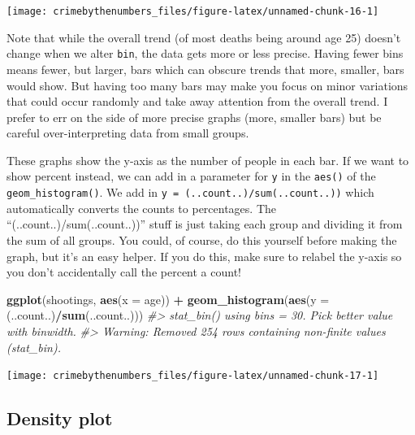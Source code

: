 \documentclass[
  12pt,
]{book}
\newenvironment{Shaded}{\begin{snugshade}}{\end{snugshade}}
\newcommand{\CommentTok}[1]{\textcolor[rgb]{0.37,0.37,0.37}{\textit{#1}}}
\newcommand{\DataTypeTok}[1]{\textcolor[rgb]{0.27,0.27,0.27}{#1}}
\newcommand{\KeywordTok}[1]{\textcolor[rgb]{0.27,0.27,0.27}{\textbf{#1}}}
\newcommand{\NormalTok}[1]{#1}
\newcommand{\OperatorTok}[1]{\textcolor[rgb]{0.43,0.43,0.43}{\textbf{#1}}}
\newcommand{\StringTok}[1]{\textcolor[rgb]{0.5,0.5,0.5}{#1}}
\begin{document}
\begin{center}\texttt{[image: crimebythenumbers\_files/figure-latex/unnamed-chunk-16-1]} \end{center}

Note that while the overall trend (of most deaths being around age 25) doesn't change when we alter \texttt{bin}, the data gets more or less precise. Having fewer bins means fewer, but larger, bars which can obscure trends that more, smaller, bars would show. But having too many bars may make you focus on minor variations that could occur randomly and take away attention from the overall trend. I prefer to err on the side of more precise graphs (more, smaller bars) but be careful over-interpreting data from small groups.

These graphs show the y-axis as the number of people in each bar. If we want to show percent instead, we can add in a parameter for \texttt{y} in the \texttt{aes()} of the \texttt{geom\_histogram()}. We add in \texttt{y\ =\ (..count..)/sum(..count..))} which automatically converts the counts to percentages. The ``(..count..)/sum(..count..))'' stuff is just taking each group and dividing it from the sum of all groups. You could, of course, do this yourself before making the graph, but it's an easy helper. If you do this, make sure to relabel the y-axis so you don't accidentally call the percent a count!

\begin{Shaded}
\begin{Highlighting}[]
\KeywordTok{ggplot}\NormalTok{(shootings, }\KeywordTok{aes}\NormalTok{(}\DataTypeTok{x =}\NormalTok{ age)) }\OperatorTok{+}\StringTok{ }
\StringTok{  }\KeywordTok{geom\_histogram}\NormalTok{(}\KeywordTok{aes}\NormalTok{(}\DataTypeTok{y =}\NormalTok{ (..count..)}\OperatorTok{/}\KeywordTok{sum}\NormalTok{(..count..)))}
\CommentTok{\#\textgreater{} \textasciigrave{}stat\_bin()\textasciigrave{} using \textasciigrave{}bins = 30\textasciigrave{}. Pick better value with \textasciigrave{}binwidth\textasciigrave{}.}
\CommentTok{\#\textgreater{} Warning: Removed 254 rows containing non{-}finite values (stat\_bin).}
\end{Highlighting}
\end{Shaded}

\begin{center}\texttt{[image: crimebythenumbers\_files/figure-latex/unnamed-chunk-17-1]} \end{center}

\hypertarget{density-plot}{%
\subsection{Density plot}\label{density-plot}}
\end{document}
